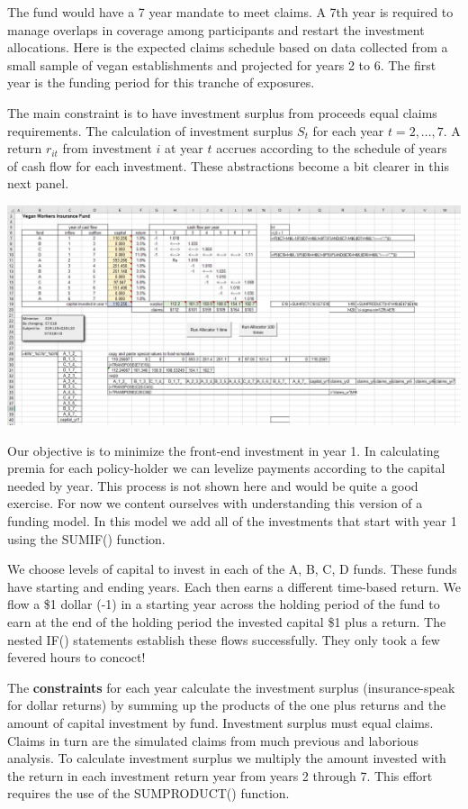 \documentclass[
]{book}
\begin{document}
The fund would have a 7 year mandate to meet claims. A 7th year is required to manage overlaps in coverage among participants and restart the investment allocations. Here is the expected claims schedule based on data collected from a small sample of vegan establishments and projected for years 2 to 6. The first year is the funding period for this tranche of exposures.

The main constraint is to have investment surplus from proceeds equal claims requirements. The calculation of investment surplus \(S_t\) for each year \(t=2,\ldots,7\). A return \(r_{it}\) from investment \(i\) at year \(t\) accrues according to the schedule of years of cash flow for each investment. These abstractions become a bit clearer in this next panel.

\includegraphics{images/06/claims-fund-allocation-base.jpg}

Our objective is to minimize the front-end investment in year 1. In calculating premia for each policy-holder we can levelize payments according to the capital needed by year. This process is not shown here and would be quite a good exercise. For now we content ourselves with understanding this version of a funding model. In this model we add all of the investments that start with year 1 using the SUMIF() function.

We choose levels of capital to invest in each of the A, B, C, D funds. These funds have starting and ending years. Each then earns a different time-based return. We flow a \$1 dollar (-1) in a starting year across the holding period of the fund to earn at the end of the holding period the invested capital \$1 plus a return. The nested IF() statements establish these flows successfully. They only took a few fevered hours to concoct!

The \textbf{constraints} for each year calculate the investment surplus (insurance-speak for dollar returns) by summing up the products of the one plus returns and the amount of capital investment by fund. Investment surplus must equal claims. Claims in turn are the simulated claims from much previous and laborious analysis. To calculate investment surplus we multiply the amount invested with the return in each investment return year from years 2 through 7. This effort requires the use of the SUMPRODUCT() function.
\end{document}
